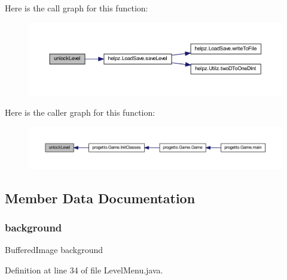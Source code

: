 Here is the call graph for this function\+:\nopagebreak
\begin{figure}[H]
\begin{center}
\leavevmode
\includegraphics[width=350pt]{classui_1_1_level_menu_a90a96ba9679b7df9cc591d4c58430615_cgraph}
\end{center}
\end{figure}
Here is the caller graph for this function\+:\nopagebreak
\begin{figure}[H]
\begin{center}
\leavevmode
\includegraphics[width=350pt]{classui_1_1_level_menu_a90a96ba9679b7df9cc591d4c58430615_icgraph}
\end{center}
\end{figure}


\subsection{Member Data Documentation}
\mbox{\label{classui_1_1_level_menu_a714354485419fb2b615f17fcce85657e}} 
\subsubsection{\texorpdfstring{background}{background}}
{\footnotesize\ttfamily Buffered\+Image background\hspace{0.3cm}{\ttfamily [private]}}



Definition at line 34 of file Level\+Menu.\+java.

\mbox{\label{classui_1_1_level_menu_a6d137cdbda7a4bbab7f28aa72fec0883}} 

